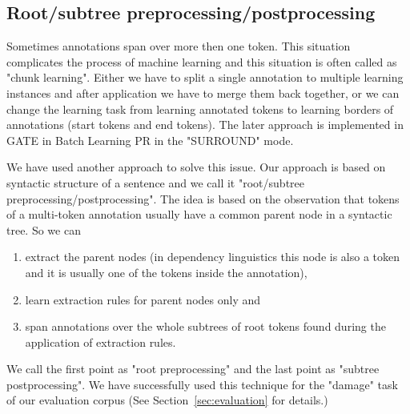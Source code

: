 \documentclass[runningheads,a4paper]{llncs}
\begin{document}

\subsection{Root/subtree preprocessing/postprocessing}
Sometimes annotations span over more then one token. This situation complicates the process of machine learning and this situation is often called as "chunk learning". Either we have to split a single annotation to multiple learning instances and after application we have to merge them back together, or we can change the learning task from learning annotated tokens to learning borders of annotations (start tokens and end tokens). The later approach is implemented in GATE in Batch Learning PR in the "SURROUND" mode.

We have used another approach to solve this issue. Our approach is based on syntactic structure of a sentence and we call it "root/subtree preprocessing/postprocessing". The idea is based on the observation that tokens of a multi-token annotation usually have a common parent node in a syntactic tree. So we can
\begin{enumerate}
	\item extract the parent nodes (in dependency linguistics this node is also a token and it is usually one of the tokens inside the annotation), 
	\item learn extraction rules for parent nodes only and 
	\item span annotations over the whole subtrees of root tokens found during the application of extraction rules.
\end{enumerate}
We call the first point as "root preprocessing" and the last point as "subtree postprocessing". We have successfully used this technique for the "damage" task of our evaluation corpus (See Section~\ref{sec:evaluation} for details.)
\end{document}
